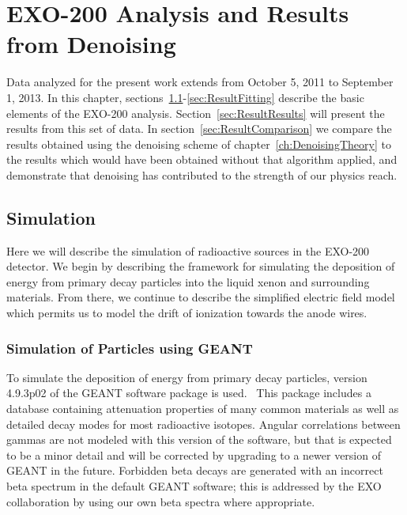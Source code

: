 
\renewcommand{\thechapter}{6}
\chapter{EXO-200 Analysis and Results from Denoising}
\label{ch:DenoisingResults}

Data analyzed for the present work extends from October 5, 2011 to September 1, 2013.  In this chapter, sections~\ref{sec:ResultSimulation}-\ref{sec:ResultFitting} describe the basic elements of the EXO-200 analysis.  Section~\ref{sec:ResultResults} will present the results from this set of data.  In section~\ref{sec:ResultComparison} we compare the results obtained using the denoising scheme of chapter~\ref{ch:DenoisingTheory} to the results which would have been obtained without that algorithm applied, and demonstrate that denoising has contributed to the strength of our physics reach.

\section{Simulation}\label{sec:ResultSimulation}

Here we will describe the simulation of radioactive sources in the EXO-200 detector.  We begin by describing the framework for simulating the deposition of energy from primary decay particles into the liquid xenon and surrounding materials.  From there, we continue to describe the simplified electric field model which permits us to model the drift of ionization towards the anode wires.

\subsection{Simulation of Particles using GEANT}

To simulate the deposition of energy from primary decay particles, version 4.9.3p02 of the GEANT software package is used.~\cite{Agostinelli2003250,1610988}  This package includes a database containing attenuation properties of many common materials as well as detailed decay modes for most radioactive isotopes.  Angular correlations between gammas are not modeled with this version of the software, but that is expected to be a minor detail and will be corrected by upgrading to a newer version of GEANT in the future.  Forbidden beta decays are generated with an incorrect beta spectrum in the default GEANT software; this is addressed by the EXO collaboration by using our own beta spectra where appropriate.

